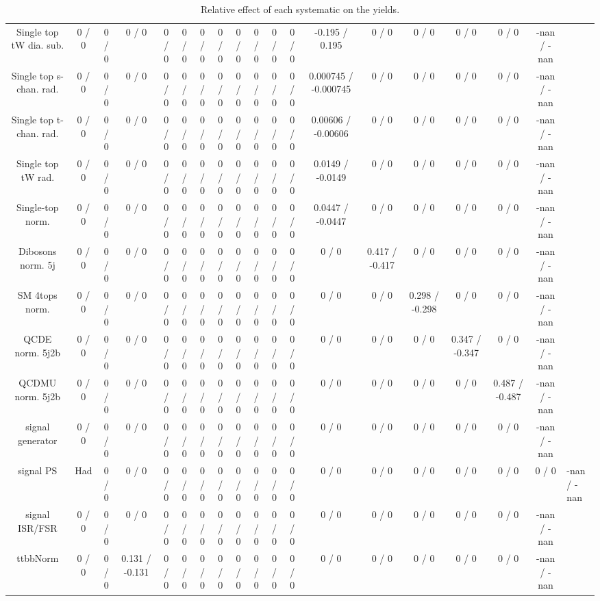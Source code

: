 \documentclass[10pt]{article}
\begin{document}
\begin{table}[htbp]
\begin{center}
\begin{tabular}{|c|c|c|c|c|c|c|c|c|c|c|c|c|c|c|c|c|c|}
  Single top tW dia. sub. & 0 / 0 & 0 / 0 & 0 / 0 & 0 / 0 & 0 / 0 & 0 / 0 & 0 / 0 & 0 / 0 & 0 / 0 & 0 / 0 & 0 / 0 & -0.195 / 0.195 & 0 / 0 & 0 / 0 & 0 / 0 & 0 / 0 & -nan / -nan \\ 
  Single top s-chan. rad. & 0 / 0 & 0 / 0 & 0 / 0 & 0 / 0 & 0 / 0 & 0 / 0 & 0 / 0 & 0 / 0 & 0 / 0 & 0 / 0 & 0 / 0 & 0.000745 / -0.000745 & 0 / 0 & 0 / 0 & 0 / 0 & 0 / 0 & -nan / -nan \\ 
  Single top t-chan. rad. & 0 / 0 & 0 / 0 & 0 / 0 & 0 / 0 & 0 / 0 & 0 / 0 & 0 / 0 & 0 / 0 & 0 / 0 & 0 / 0 & 0 / 0 & 0.00606 / -0.00606 & 0 / 0 & 0 / 0 & 0 / 0 & 0 / 0 & -nan / -nan \\ 
  Single top tW rad. & 0 / 0 & 0 / 0 & 0 / 0 & 0 / 0 & 0 / 0 & 0 / 0 & 0 / 0 & 0 / 0 & 0 / 0 & 0 / 0 & 0 / 0 & 0.0149 / -0.0149 & 0 / 0 & 0 / 0 & 0 / 0 & 0 / 0 & -nan / -nan \\ 
  Single-top norm. & 0 / 0 & 0 / 0 & 0 / 0 & 0 / 0 & 0 / 0 & 0 / 0 & 0 / 0 & 0 / 0 & 0 / 0 & 0 / 0 & 0 / 0 & 0.0447 / -0.0447 & 0 / 0 & 0 / 0 & 0 / 0 & 0 / 0 & -nan / -nan \\ 
  Dibosons norm. 5j & 0 / 0 & 0 / 0 & 0 / 0 & 0 / 0 & 0 / 0 & 0 / 0 & 0 / 0 & 0 / 0 & 0 / 0 & 0 / 0 & 0 / 0 & 0 / 0 & 0.417 / -0.417 & 0 / 0 & 0 / 0 & 0 / 0 & -nan / -nan \\ 
  SM 4tops norm. & 0 / 0 & 0 / 0 & 0 / 0 & 0 / 0 & 0 / 0 & 0 / 0 & 0 / 0 & 0 / 0 & 0 / 0 & 0 / 0 & 0 / 0 & 0 / 0 & 0 / 0 & 0.298 / -0.298 & 0 / 0 & 0 / 0 & -nan / -nan \\ 
  QCDE norm. 5j2b & 0 / 0 & 0 / 0 & 0 / 0 & 0 / 0 & 0 / 0 & 0 / 0 & 0 / 0 & 0 / 0 & 0 / 0 & 0 / 0 & 0 / 0 & 0 / 0 & 0 / 0 & 0 / 0 & 0.347 / -0.347 & 0 / 0 & -nan / -nan \\ 
  QCDMU norm. 5j2b & 0 / 0 & 0 / 0 & 0 / 0 & 0 / 0 & 0 / 0 & 0 / 0 & 0 / 0 & 0 / 0 & 0 / 0 & 0 / 0 & 0 / 0 & 0 / 0 & 0 / 0 & 0 / 0 & 0 / 0 & 0.487 / -0.487 & -nan / -nan \\ 
  signal generator & 0 / 0 & 0 / 0 & 0 / 0 & 0 / 0 & 0 / 0 & 0 / 0 & 0 / 0 & 0 / 0 & 0 / 0 & 0 / 0 & 0 / 0 & 0 / 0 & 0 / 0 & 0 / 0 & 0 / 0 & 0 / 0 & -nan / -nan \\ 
  signal PS & Had & 0 / 0 & 0 / 0 & 0 / 0 & 0 / 0 & 0 / 0 & 0 / 0 & 0 / 0 & 0 / 0 & 0 / 0 & 0 / 0 & 0 / 0 & 0 / 0 & 0 / 0 & 0 / 0 & 0 / 0 & 0 / 0 & -nan / -nan \\ 
  signal ISR/FSR & 0 / 0 & 0 / 0 & 0 / 0 & 0 / 0 & 0 / 0 & 0 / 0 & 0 / 0 & 0 / 0 & 0 / 0 & 0 / 0 & 0 / 0 & 0 / 0 & 0 / 0 & 0 / 0 & 0 / 0 & 0 / 0 & -nan / -nan \\ 
 ttbbNorm & 0 / 0 & 0 / 0 & 0.131 / -0.131 & 0 / 0 & 0 / 0 & 0 / 0 & 0 / 0 & 0 / 0 & 0 / 0 & 0 / 0 & 0 / 0 & 0 / 0 & 0 / 0 & 0 / 0 & 0 / 0 & 0 / 0 & -nan / -nan \\ 
\hline 
\end{tabular} 
\caption{Relative effect of each systematic on the yields.} 
\end{center} 
\end{table} 
\end{document}
